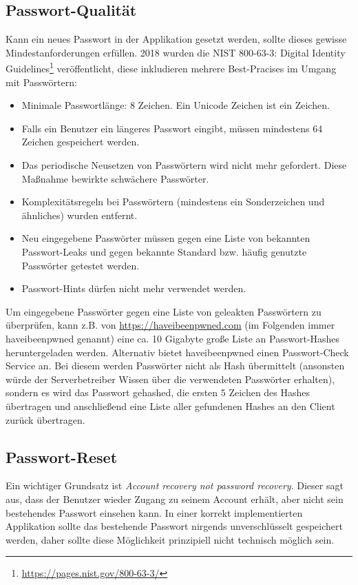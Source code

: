 \subsection{Passwort-Qualität}

Kann ein neues Passwort in der Applikation gesetzt werden, sollte dieses gewisse Mindestanforderungen erfüllen. 2018 wurden die NIST 800-63-3: Digital Identity Guidelines\footnote{\url{https://pages.nist.gov/800-63-3/}} veröffentlicht, diese inkludieren mehrere Best-Pracises im Umgang mit Passwörtern:

\begin{itemize}
	\item Minimale Passwortlänge: 8 Zeichen. Ein Unicode Zeichen ist ein Zeichen.
	\item Falls ein Benutzer ein längeres Passwort eingibt, müssen mindestens 64 Zeichen gespeichert werden.
	\item Das periodische Neusetzen von Passwörtern wird nicht mehr gefordert. Diese Maßnahme bewirkte schwächere Passwörter.
	\item Komplexitätsregeln bei Passwörtern (mindestens ein Sonderzeichen und ähnliches) wurden entfernt.
	\item Neu eingegebene Passwörter müssen gegen eine Liste von bekannten Passwort-Leaks und gegen bekannte Standard bzw. häufig genutzte Passwörter getestet werden.
	\item Passwort-Hints dürfen nicht mehr verwendet werden.
\end{itemize}

Um eingegebene Passwörter gegen eine Liste von geleakten Passwörtern zu überprüfen, kann z.B. von \url{https://haveibeenpwned.com} (im Folgenden immer haveibeenpwned genannt) eine ca. 10 Gigabyte große Liste an Passwort-Hashes heruntergeladen werden. Alternativ bietet haveibeenpwned einen Passwort-Check Service an. Bei diesem werden Passwörter nicht als Hash übermittelt (ansonsten würde der Serverbetreiber Wissen über die verwendeten Passwörter erhalten), sondern es wird das Passwort gehashed, die ersten 5 Zeichen des Hashes übertragen und anschließend eine Liste aller gefundenen Hashes an den Client zurück übertragen.

\subsection{Passwort-Reset}

Ein wichtiger Grundsatz ist \textit{Account recovery not password recovery}. Dieser sagt aus, dass der Benutzer wieder Zugang zu seinem Account erhält, aber nicht sein bestehendes Passwort einsehen kann. In einer korrekt implementierten Applikation sollte das bestehende Passwort nirgends unverschlüsselt gespeichert werden, daher sollte diese Möglichkeit prinzipiell nicht technisch möglich sein.


